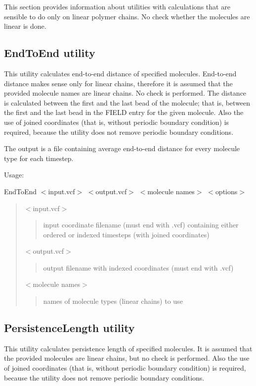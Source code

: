 This section provides information about utilities with calculations that are sensible to do only on linear polymer chains. No check whether the molecules are linear is done.\hypertarget{LinearChains_EndToEnd}{}\subsection{End\+To\+End utility}\label{LinearChains_EndToEnd}
This utility calculates end-\/to-\/end distance of specified molecules. End-\/to-\/end distance makes sense only for linear chains, therefore it is assumed that the provided molecule names are linear chains. No check is performed. The distance is calculated between the first and the last bead of the molecule; that is, between the first and the last bead in the {\ttfamily F\+I\+E\+LD} entry for the given molecule. Also the use of joined coordinates (that is, without periodic boundary condition) is required, because the utility does not remove periodic boundary conditions.

The output is a file containing average end-\/to-\/end distance for every molecule type for each timestep.

Usage\+:

{\ttfamily End\+To\+End $<$input.\+vcf$>$ $<$output.\+vcf$>$ $<$molecule names$>$ $<$options$>$}

\begin{quote}
{\ttfamily $<$input.\+vcf$>$} \begin{quote}
input coordinate filename (must end with {\ttfamily .vcf}) containing either ordered or indexed timesteps (with joined coordinates) \end{quote}
{\ttfamily $<$output.\+vcf$>$} \begin{quote}
output filename with indexed coordinates (must end with {\ttfamily .vcf}) \end{quote}
{\ttfamily $<$molecule names$>$} \begin{quote}
names of molecule types (linear chains) to use \end{quote}
\end{quote}
\hypertarget{LinearChains_PersistenceLength}{}\subsection{Persistence\+Length utility}\label{LinearChains_PersistenceLength}
This utility calculates persistence length of specified molecules. It is assumed that the provided molecules are linear chains, but no check is performed. Also the use of joined coordinates (that is, without periodic boundary condition) is required, because the utility does not remove periodic boundary conditions.

